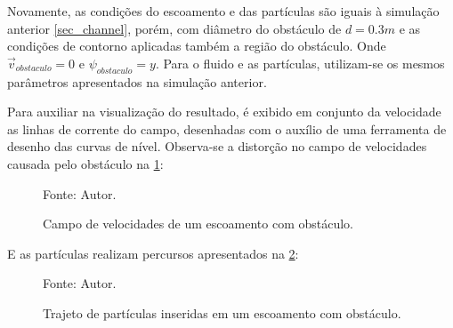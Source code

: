 Novamente, as condições do escoamento e das partículas são iguais à simulação anterior \ref{sec_channel}, porém, com diâmetro do obstáculo de $d=0.3m$ e as condições de contorno aplicadas também a região do obstáculo.
Onde $\vec{v}_{obstaculo}=0$ e $\psi_{obstaculo}=y$.
Para o fluido e as partículas, utilizam-se os mesmos parâmetros apresentados na simulação anterior.

Para auxiliar na visualização do resultado, é exibido em conjunto da velocidade as linhas de corrente do campo, desenhadas com o auxílio de uma ferramenta de desenho das curvas de nível.
Observa-se a distorção no campo de velocidades causada pelo obstáculo na \ref{obstacle_result}:
\begin{figure}[H]
    \centering
     {\raggedleft \scriptsize Fonte: Autor.}
    \caption{Campo de velocidades de um escoamento com obstáculo.}
    \label{obstacle_result}
\end{figure}

E as partículas realizam percursos apresentados na \ref{obstacle_trajectory}:
\begin{figure}[H]
    \centering
     {\raggedleft \scriptsize Fonte: Autor.}
    \caption{Trajeto de partículas inseridas em um escoamento com obstáculo.}
    \label{obstacle_trajectory}
\end{figure}

